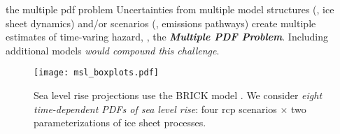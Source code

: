 \begin{block}{the multiple pdf problem}
    Uncertainties from multiple model structures (\eg, ice sheet dynamics) and/or scenarios (\eg, emissions pathways) create multiple estimates of time-varing hazard, \ie, the \textbf{\itshape{Multiple PDF Problem}}.
    Including additional models \cite{kopp_evolving:2017,deconto_antarctica:2016,ruckert_coastal:2019} \emph{would compound this challenge}.
    \begin{framed}
        \begin{figure}
            \centering
            \texttt{[image: msl\_boxplots.pdf]}
            \caption{
                Sea level rise projections use the BRICK model \cite{wong_brick0.2:2017,ruckert_coastal:2019}.
                We consider \emph{eight time-dependent PDFs of sea level rise}: four \gls{rcp} scenarios $\times$ two parameterizations of ice sheet processes.
            }\label{fig:boxplots}
        \end{figure}
    \end{framed}
\end{block}